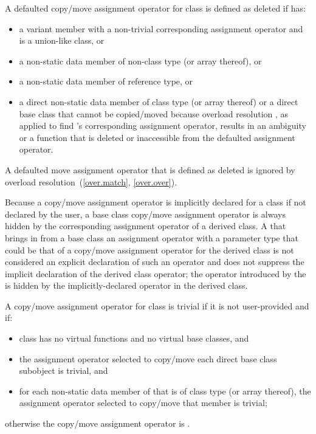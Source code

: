 \pnum
A defaulted copy/move assignment operator for
class  is defined as deleted if  has:
\begin{itemize}
\item a variant member with a non-trivial corresponding assignment operator and
   is a union-like class, or

\item a non-static data member of  non-class
  type (or array thereof), or

\item a non-static data member of reference type, or

\item a direct non-static data member of class type 
  (or array thereof) or a direct base class 
  that cannot be copied/moved because overload resolution
 , as applied to find 's corresponding
  assignment operator, results in an ambiguity or
  a function that is deleted or inaccessible from the
  defaulted assignment operator.
\end{itemize}

A defaulted move assignment operator that is defined as deleted is ignored by
overload resolution~(\ref{over.match}, \ref{over.over}).

\pnum
{}%
%
Because a copy/move assignment operator is implicitly declared for a class
if not declared by the user,
a base class copy/move assignment operator is always hidden
by the corresponding assignment operator of a derived class.
A
 that brings in from a base class an assignment operator
with a parameter type that could be that of a
copy/move assignment operator for the
derived class is not considered an explicit declaration of such an
operator and does not suppress the implicit declaration of the derived class
operator;
the operator introduced by the
is hidden by the implicitly-declared operator in the derived
class.

\pnum
{}%
%
A copy/move assignment operator for class
is
trivial
if it is not user-provided and if:
\begin{itemize}
\item
class
has no virtual functions
and no virtual base classes, and

\item the assignment operator selected to copy/move each direct
base class subobject is trivial, and

\item
for each non-static data member of
that is of class type (or array thereof),
the assignment operator selected to copy/move that member is trivial;
\end{itemize}
%
otherwise the copy/move assignment operator is
.

